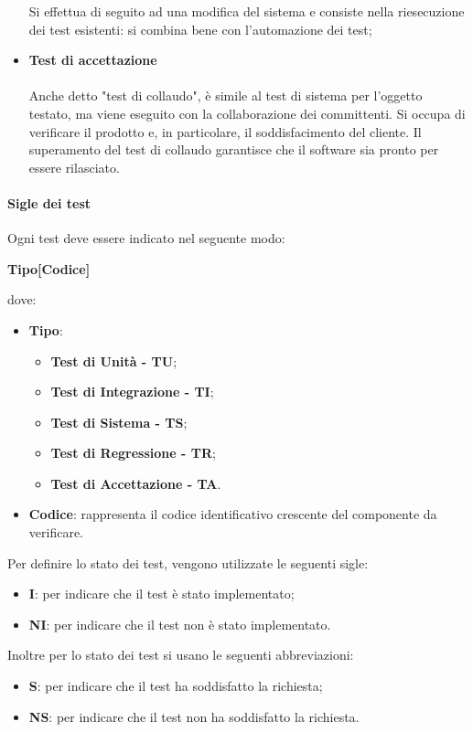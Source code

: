 \begin{itemize}
			Si effettua di seguito ad una modifica del sistema e consiste nella riesecuzione dei test esistenti: si combina bene con l'automazione dei test; \newline \newline
			\item \textbf{Test di accettazione} \mbox{}\\ \mbox{}\\
			Anche detto "test di collaudo", è simile al test di sistema per l'oggetto testato, ma viene eseguito con la collaborazione dei committenti. Si occupa di verificare il prodotto e, in particolare, il soddisfacimento del cliente. Il superamento del test di collaudo garantisce che il software sia pronto per essere rilasciato.
			\end{itemize}
		\paragraph{Sigle dei test}
		Ogni test deve essere indicato nel seguente modo: \\
		\centerline{\textbf{Tipo[Codice]}}
				dove:
				\begin{itemize}
					\item \textbf{Tipo}: 
						\begin{itemize}
							\item \textbf{Test di Unità - TU};
							\item \textbf{Test di Integrazione - TI}; 
							\item \textbf{Test di Sistema - TS};
							\item \textbf{Test di Regressione - TR};
							\item \textbf{Test di Accettazione - TA}.	
						\end{itemize}
					\item \textbf{Codice}: rappresenta il codice identificativo crescente
					del componente da verificare.
				\end{itemize}
		
		
		Per definire lo stato dei test, vengono utilizzate le seguenti sigle:
		\begin{itemize}
			\item \textbf{I}: per indicare che il test è stato implementato;
			\item \textbf{NI}: per indicare che il test non è stato implementato.
		\end{itemize}
		
		Inoltre per lo stato dei test si usano le seguenti abbreviazioni:
		\begin{itemize}
			\item \textbf{S}: per indicare che il test ha soddisfatto la richiesta;
			\item \textbf{NS}: per indicare che il test non ha soddisfatto la richiesta.
		\end{itemize}

